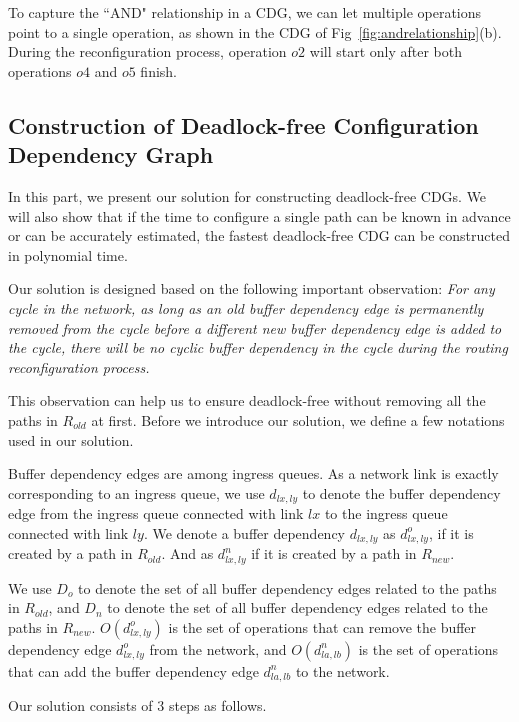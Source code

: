 To capture the ``AND" relationship in a CDG, we can let multiple operations point to a single operation, as shown  in the CDG of Fig~\ref{fig:andrelationship}(b). During the reconfiguration process, operation $o2$ will start only after both operations $o4$ and $o5$ finish.

\subsection{Construction of Deadlock-free Configuration Dependency Graph}\label{subsec:dfcdg}

In this part, we present our solution for constructing deadlock-free CDGs. We will also show that if the time to configure a single path can be known in advance or can be accurately estimated, the fastest deadlock-free CDG can be constructed in polynomial time.

Our solution is designed based on the following important observation: \textit{For any cycle in the network, as long as an old buffer dependency edge is permanently removed from the cycle before a different new buffer dependency edge is added to the cycle, there will be no cyclic buffer dependency in the cycle during the routing reconfiguration process.}

This observation can help us to ensure deadlock-free without removing all the paths in $R_{old}$ at first. Before we introduce our solution, we define a few notations used in our solution.

Buffer dependency edges are among ingress queues. As a network link is exactly corresponding to an ingress queue, we use $d_{lx,ly}$ to denote the buffer dependency edge from the ingress queue connected with link $lx$ to the ingress queue connected with link $ly$. We denote a buffer dependency $d_{lx,ly}$ as $d^{o}_{lx,ly}$, if it is created by a path in $R_{old}$. And as $d^{n}_{lx,ly}$ if it is created by a path in $R_{new}$.

We use $D_{o}$ to denote the set of all buffer dependency edges related to the paths in $R_{old}$, and $D_{n}$ to denote the set of all buffer dependency edges related to the paths in $R_{new}$. $O(d^{o}_{lx,ly})$ is the set of operations that can remove the buffer dependency edge $d^{o}_{lx,ly}$ from the network, and $O(d^{n}_{la,lb})$ is the set of operations that can add the buffer dependency edge $d^{n}_{la,lb}$ to the network.



Our solution consists of 3 steps as follows.

